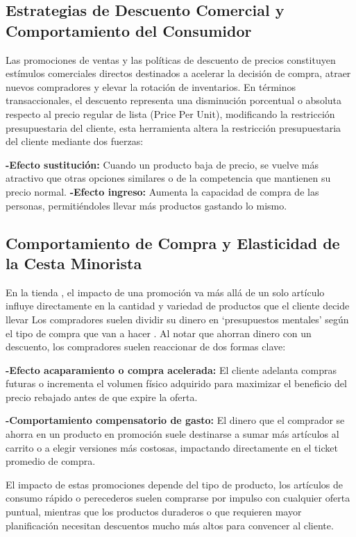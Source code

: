 \documentclass[oneside,11pt]{Latex/Classes/PhDthesisPSnPDF}
\begin{document}
\subsection{Estrategias de Descuento Comercial y Comportamiento del Consumidor}

Las promociones de ventas y las políticas de descuento de precios
constituyen estímulos comerciales directos destinados a acelerar la
decisión de compra, atraer nuevos compradores y elevar la rotación de
inventarios. En términos transaccionales, el descuento representa una
disminución porcentual o absoluta respecto al precio regular de lista
(Price Per Unit), modificando la restricción presupuestaria del cliente,
esta herramienta altera la restricción presupuestaria del cliente
mediante dos fuerzas:

\textbf{-Efecto sustitución:} Cuando un producto baja de precio, se
vuelve más atractivo que otras opciones similares o de la competencia
que mantienen su precio normal. \textbf{-Efecto ingreso:} Aumenta la
capacidad de compra de las personas, permitiéndoles llevar más productos
gastando lo mismo.\\

\subsection{Comportamiento de Compra y Elasticidad de la Cesta Minorista}

En la tienda , el impacto de una promoción va más allá de un solo
artículo influye directamente en la cantidad y variedad de productos que
el cliente decide llevar Los compradores suelen dividir su dinero en
`presupuestos mentales' según el tipo de compra que van a hacer . Al
notar que ahorran dinero con un descuento, los compradores suelen
reaccionar de dos formas clave:

\textbf{-Efecto acaparamiento o compra acelerada:} El cliente adelanta
compras futuras o incrementa el volumen físico adquirido para maximizar
el beneficio del precio rebajado antes de que expire la oferta.

\textbf{-Comportamiento compensatorio de gasto:} El dinero que el
comprador se ahorra en un producto en promoción suele destinarse a sumar
más artículos al carrito o a elegir versiones más costosas, impactando
directamente en el ticket promedio de compra.

El impacto de estas promociones depende del tipo de producto, los
artículos de consumo rápido o perecederos suelen comprarse por impulso
con cualquier oferta puntual, mientras que los productos duraderos o que
requieren mayor planificación necesitan descuentos mucho más altos para
convencer al cliente.\\
\end{document}
